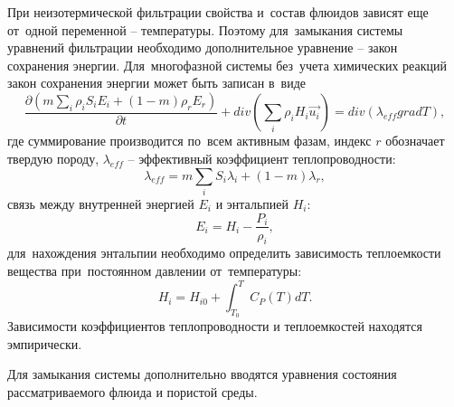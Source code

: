 При неизотермической фильтрации свойства и~состав флюидов зависят еще от~одной переменной -- температуры.
Поэтому для~замыкания системы уравнений фильтрации необходимо дополнительное уравнение --
закон сохранения энергии. Для~многофазной системы без~учета химических реакций закон сохранения энергии 
может быть записан в~виде
\begin{equation}
\label{Energy_law}
  \frac{\partial \left(m {\sum\limits_{i}{\rho_i S_i E_i}} + (1-m){\rho_r E_r}\right)}{\partial t}
    + div(\sum_{i}{\rho_i H_i \overrightarrow{u_i}}) = div(\lambda_{eff} grad T),
\end{equation}
где суммирование производится по~всем активным фазам, индекс $r$ обозначает твердую породу,
$\lambda_{eff}$ -- эффективный коэффициент теплопроводности:
\begin{equation}
\lambda_{eff}=m\sum_i{S_i\lambda_i} + (1-m)\lambda_r,
\end{equation}
связь между внутренней энергией $E_i$ и энтальпией $H_i$:
\begin{equation}
E_i=H_i-\frac{P_i}{\rho_i},
\end{equation} для~нахождения энтальпии необходимо определить зависимость теплоемкости
вещества при~постоянном давлении от~температуры:
\begin{equation}
H_i=H_{i0}+\int_{T_0}^{T}{C_P(T)dT}.
\end{equation}
Зависимости коэффициентов теплопроводности и теплоемкостей находятся эмпирически.

Для замыкания системы дополнительно вводятся уравнения состояния рассматриваемого флюида
и пористой среды.
